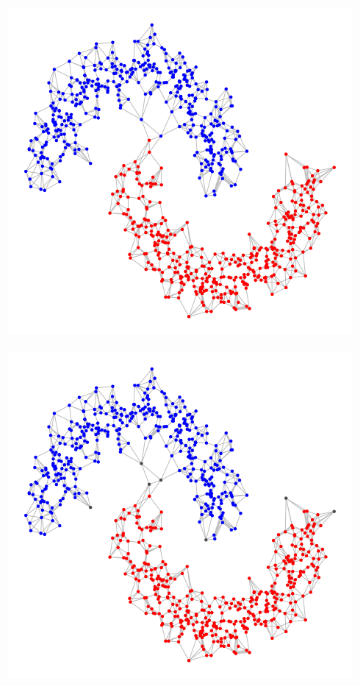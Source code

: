 \documentclass{article}
\newcommand{\1}{\mathbf{1}}
\theoremstyle{aldenthm}
\theoremstyle{aldenrmrk}
\begin{document}
\begin{figure}
\begin{adjustbox}{minipage=\linewidth}
\begin{subfigure}{.24\linewidth}
			\caption{}
		\end{subfigure}
		\begin{subfigure}{.24\linewidth}
			\includegraphics[width=\linewidth]{example2plots/row1_conductance_cluster}
			\caption{}
		\end{subfigure}
		\begin{subfigure}{.24\linewidth}
			\includegraphics[width=\linewidth]{example2plots/row1_density_cluster}
			\caption{}
		\end{subfigure}
		

\end{adjustbox}
\end{figure}
\end{document}
